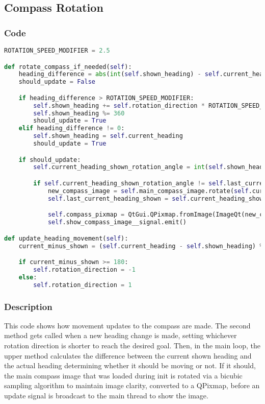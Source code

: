 \subsection{Compass Rotation}
\subsubsection{Code}
\begin{lstlisting}[language=python]
ROTATION_SPEED_MODIFIER = 2.5

def rotate_compass_if_needed(self):
    heading_difference = abs(int(self.shown_heading) - self.current_heading)
    should_update = False

    if heading_difference > ROTATION_SPEED_MODIFIER:
        self.shown_heading += self.rotation_direction * ROTATION_SPEED_MODIFIER
        self.shown_heading %= 360
        should_update = True
    elif heading_difference != 0:
        self.shown_heading = self.current_heading
        should_update = True

    if should_update:
        self.current_heading_shown_rotation_angle = int(self.shown_heading)

        if self.current_heading_shown_rotation_angle != self.last_current_heading_shown:
            new_compass_image = self.main_compass_image.rotate(self.current_heading_shown_rotation_angle, resample=PIL.Image.BICUBIC)
            self.last_current_heading_shown = self.current_heading_shown_rotation_angle

            self.compass_pixmap = QtGui.QPixmap.fromImage(ImageQt(new_compass_image))
            self.show_compass_image__signal.emit()

def update_heading_movement(self):
    current_minus_shown = (self.current_heading - self.shown_heading) % 360

    if current_minus_shown >= 180:
        self.rotation_direction = -1
    else:
        self.rotation_direction = 1
\end{lstlisting}
\subsubsection{Description}
This code shows how movement updates to the compass are made. The second method gets called when a new heading change is made, setting whichever rotation direction is shorter to reach the desired goal. Then, in the main loop, the upper method calculates the difference between the current shown heading and the actual heading determining whether it should be moving or not. If it should, the main compass image that was loaded during init is rotated via a bicubic sampling algorithm to maintain image clarity, converted to a QPixmap, before an update signal is broadcast to the main thread to show the image.